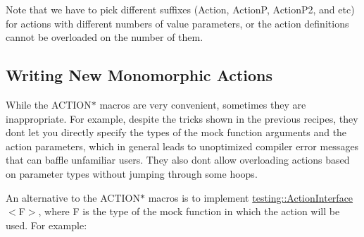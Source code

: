 Note that we have to pick different suffixes ({\ttfamily Action}, {\ttfamily ActionP}, {\ttfamily Action\+P2}, and etc) for actions with different numbers of value parameters, or the action definitions cannot be overloaded on the number of them.

\subsection*{Writing New Monomorphic Actions}

While the {\ttfamily A\+C\+T\+I\+O\+N$\ast$} macros are very convenient, sometimes they are inappropriate. For example, despite the tricks shown in the previous recipes, they don\textquotesingle{}t let you directly specify the types of the mock function arguments and the action parameters, which in general leads to unoptimized compiler error messages that can baffle unfamiliar users. They also don\textquotesingle{}t allow overloading actions based on parameter types without jumping through some hoops.

An alternative to the {\ttfamily A\+C\+T\+I\+O\+N$\ast$} macros is to implement {\ttfamily \mbox{\hyperlink{classtesting_1_1_action_interface}{testing\+::\+Action\+Interface}}$<$F$>$}, where {\ttfamily F} is the type of the mock function in which the action will be used. For example\+:


